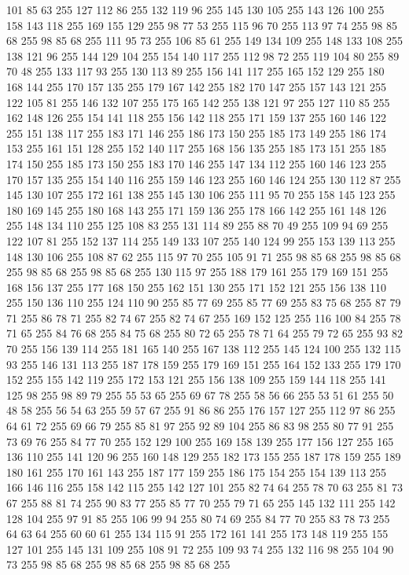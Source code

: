 101 85 63 255 127 112 86 255 132 119 96 255 145 130 105 255 143 126 100 255 158 143 118 255 169 155 129 255 98 77 53 255 115 96 70 255 113 97 74 255 98 85 68 255 98 85 68 255 111 95 73 255 106 85 61 255 149 134 109 255 148 133 108 255 138 121 96 255 144 129 104 255 154 140 117 255 112 98 72 255 119 104 80 255 89 70 48 255 133 117 93 255 130 113 89 255 156 141 117 255 165 152 129 255 180 168 144 255 170 157 135 255 179 167 142 255 182 170 147 255 157 143 121 255 122 105 81 255 146 132 107 255 175 165 142 255 138 121 97 255 127 110 85 255 162 148 126 255 154 141 118 255 156 142 118 255 171 159 137 255 160 146 122 255 151 138 117 255 183 171 146 255 186 173 150 255 185 173 149 255 186 174 153 255 161 151 128 255 152 140 117 255 168 156 135 255 185 173 151 255 185 174 150 255 185 173 150 255 183 170 146 255 147 134 112 255 160 146 123 255 170 157 135 255 154 140 116 255 159 146 123 255 160 146 124 255 130 112 87 255 145 130 107 255 172 161 138 255 145 130 106 255 111 95 70 255
158 145 123 255 180 169 145 255 180 168 143 255 171 159 136 255 178 166 142 255 161 148 126 255 148 134 110 255 125 108 83 255 131 114 89 255 88 70 49 255 109 94 69 255 122 107 81 255 152 137 114 255 149 133 107 255 140 124 99 255 153 139 113 255 148 130 106 255 108 87 62 255 115 97 70 255 105 91 71 255 98 85 68 255 98 85 68 255 98 85 68 255 98 85 68 255 130 115 97 255 188 179 161 255 179 169 151 255 168 156 137 255 177 168 150 255 162 151 130 255 171 152 121 255 156 138 110 255 150 136 110 255 124 110 90 255 85 77 69 255 85 77 69 255 83 75 68 255 87 79 71 255 86 78 71 255 82 74 67 255 82 74 67 255 169 152 125 255 116 100 84 255 78 71 65 255 84 76 68 255 84 75 68 255 80 72 65 255 78 71 64 255 79 72 65 255 93 82 70 255 156 139 114 255 181 165 140 255 167 138 112 255 145 124 100 255 132 115 93 255 146 131 113 255 187 178 159 255 179 169 151 255 164 152 133 255 179 170 152 255 155 142 119 255 172 153 121 255 156 138 109 255 159 144 118 255
141 125 98 255 98 89 79 255 55 53 65 255 69 67 78 255 58 56 66 255 53 51 61 255 50 48 58 255 56 54 63 255 59 57 67 255 91 86 86 255 176 157 127 255 112 97 86 255 64 61 72 255 69 66 79 255 85 81 97 255 92 89 104 255 86 83 98 255 80 77 91 255 73 69 76 255 84 77 70 255 152 129 100 255 169 158 139 255 177 156 127 255 165 136 110 255 141 120 96 255 160 148 129 255 182 173 155 255 187 178 159 255 189 180 161 255 170 161 143 255 187 177 159 255 186 175 154 255 154 139 113 255 166 146 116 255 158 142 115 255 142 127 101 255 82 74 64 255 78 70 63 255 81 73 67 255 88 81 74 255 90 83 77 255 85 77 70 255 79 71 65 255 145 132 111 255 142 128 104 255 97 91 85 255 106 99 94 255 80 74 69 255 84 77 70 255 83 78 73 255 64 63 64 255 60 60 61 255 134 115 91 255 172 161 141 255 173 148 119 255 155 127 101 255 145 131 109 255 108 91 72 255 109 93 74 255 132 116 98 255 104 90 73 255 98 85 68 255 98 85 68 255 98 85 68 255
